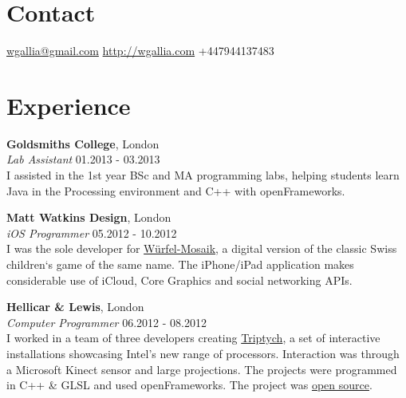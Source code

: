 \documentclass[margin,line,a4paper]{resume}
\begin{document}

\begin{resume}

\section{\mysidestyle Contact}

\hypersetup{urlcolor=Fuchsia}
\href{mailto:wgallia@gmail.com}{wgallia@gmail.com} \hfill
\hypersetup{urlcolor=RoyalBlue}
\href{http://wgallia.com}{http://wgallia.com} \hfill
+447944137483 \\

% 

\section{\mysidestyle Experience}

\textbf{Goldsmiths College}, London \vspace{1mm}\\
\textsl{Lab Assistant} \hfill 01.2013 - 03.2013 \vspace{2mm} \\
I assisted in the 1st year BSc and MA programming labs, helping students learn Java in the Processing environment and C++ with openFrameworks.

\textbf{Matt Watkins Design}, London \vspace{1mm}\\
\textsl{iOS Programmer} \hfill 05.2012 - 10.2012 \vspace{2mm} \\
I was the sole developer for \href{http://wurfelmosaik.com/}{W\"{u}rfel-Mosaik}, a digital version of the classic Swiss children`s game of the same name. The iPhone/iPad application makes considerable use of iCloud, Core Graphics and social networking APIs.

\textbf{Hellicar \& Lewis}, London \vspace{1mm}\\
\textsl{Computer Programmer} \hfill 06.2012 - 08.2012 \vspace{2mm} \\
I worked in a team of three developers creating \href{http://www.hellicarandlewis.com/2012/07/19/triptych}{Triptych}, a set of interactive installations showcasing Intel's new range of processors. Interaction was through a Microsoft Kinect sensor and large projections. The projects were programmed in C++ \& GLSL and used openFrameworks. The project was \href{https://github.com/HellicarAndLewis/Triptych}{open source}.


\end{resume}
\end{document}

